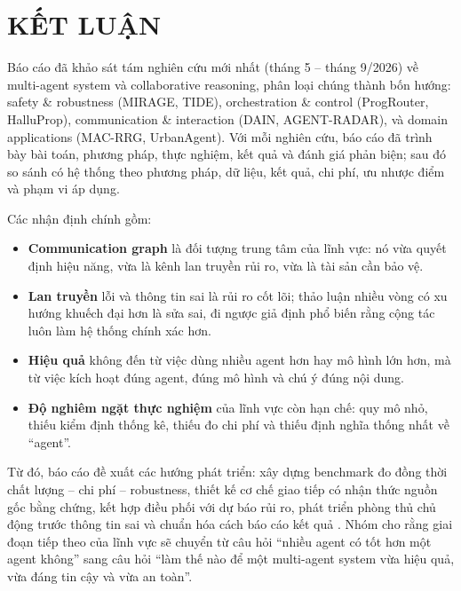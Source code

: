 \chapter{KẾT LUẬN}
\label{chap:conclusion}

Báo cáo đã khảo sát tám nghiên cứu mới nhất (tháng 5 -- tháng 9/2026) về multi-agent system và collaborative reasoning, phân loại chúng thành bốn hướng: safety \& robustness (MIRAGE, TIDE), orchestration \& control (ProgRouter, HalluProp), communication \& interaction (DAIN, AGENT-RADAR), và domain applications (MAC-RRG, UrbanAgent). Với mỗi nghiên cứu, báo cáo đã trình bày bài toán, phương pháp, thực nghiệm, kết quả và đánh giá phản biện; sau đó so sánh có hệ thống theo phương pháp, dữ liệu, kết quả, chi phí, ưu nhược điểm và phạm vi áp dụng.

Các nhận định chính gồm:
\begin{itemize}
  \item \textbf{Communication graph} là đối tượng trung tâm của lĩnh vực: nó vừa quyết định hiệu năng, vừa là kênh lan truyền rủi ro, vừa là tài sản cần bảo vệ.
  \item \textbf{Lan truyền} lỗi và thông tin sai là rủi ro cốt lõi; thảo luận nhiều vòng có xu hướng khuếch đại hơn là sửa sai, đi ngược giả định phổ biến rằng cộng tác luôn làm hệ thống chính xác hơn.
  \item \textbf{Hiệu quả} không đến từ việc dùng nhiều agent hơn hay mô hình lớn hơn, mà từ việc kích hoạt đúng agent, đúng mô hình và chú ý đúng nội dung.
  \item \textbf{Độ nghiêm ngặt thực nghiệm} của lĩnh vực còn hạn chế: quy mô nhỏ, thiếu kiểm định thống kê, thiếu đo chi phí và thiếu định nghĩa thống nhất về ``agent''.
\end{itemize}

Từ đó, báo cáo đề xuất các hướng phát triển: xây dựng benchmark đo đồng thời chất lượng -- chi phí -- robustness, thiết kế cơ chế giao tiếp có nhận thức nguồn gốc bằng chứng, kết hợp điều phối với dự báo rủi ro, phát triển phòng thủ chủ động trước thông tin sai và chuẩn hóa cách báo cáo kết quả \MAS. Nhóm cho rằng giai đoạn tiếp theo của lĩnh vực sẽ chuyển từ câu hỏi ``nhiều agent có tốt hơn một agent không'' sang câu hỏi ``làm thế nào để một multi-agent system vừa hiệu quả, vừa đáng tin cậy và vừa an toàn''.
